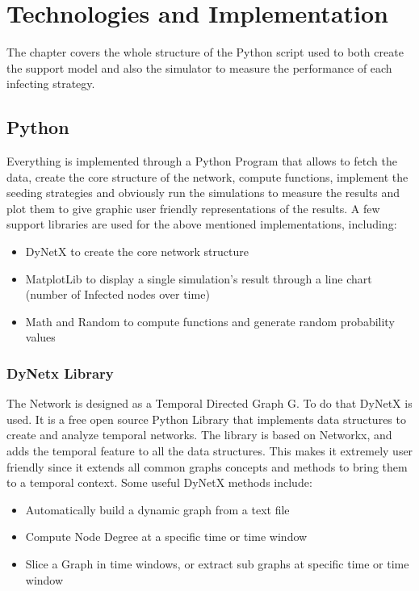 \chapter{Technologies and Implementation}
\label{cha:tech}
The chapter covers the whole structure of the Python script used to both create the support model and also the simulator to measure the performance of each infecting strategy.

\section{Python}
\label{sec:python}
Everything is implemented through  a Python Program that allows to fetch the data, create the core structure of the network, compute functions, implement the seeding strategies and obviously run the simulations to measure the results and plot them to give graphic user friendly representations of the results.
A few support libraries are used for the above mentioned implementations, including:
\begin{itemize}
\item DyNetX to create the core network structure
\item MatplotLib to display a single simulation's result through a line chart (number of Infected nodes over time)
\item Math and Random to compute functions and generate random probability values
\end{itemize}

\subsection{DyNetx Library}
\label{sec:dynetx}
The Network is designed as a Temporal Directed Graph G. To do that DyNetX is used. It is a free open source Python Library that implements data structures to create and analyze temporal networks. The library is based on Networkx, and adds the temporal feature to all the data structures. This makes it extremely user friendly since it extends all common graphs concepts and methods to bring them to a temporal context. Some useful DyNetX methods include:
\begin{itemize}
\item Automatically build a dynamic graph from a text file
\item Compute Node Degree at a specific time or time window
\item Slice a Graph in time windows, or extract sub graphs at specific time or time window
\end{itemize}

